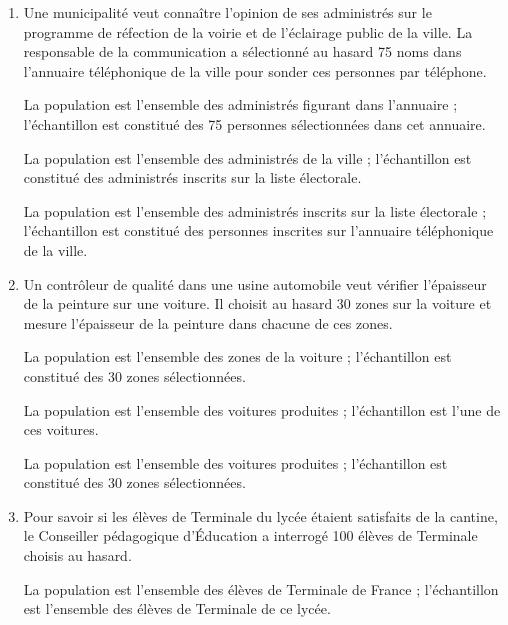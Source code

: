%
%
    \begin{enumerate}
        \item Une municipalité veut connaître l'opinion de ses administrés sur le programme de réfection de la voirie et de l'éclairage public de la ville. La responsable de la communication a sélectionné au hasard 75 noms dans l'annuaire téléphonique de la ville pour sonder ces personnes par téléphone.
              \begin{QCM}
                   La population est l'ensemble des administrés figurant dans l'annuaire ; l'échantillon est constitué des 75 personnes sélectionnées dans cet annuaire.

                  \choice La population est l'ensemble des administrés de la ville ; l'échantillon est constitué des administrés inscrits sur la liste électorale.

                  \choice La population est l'ensemble des administrés inscrits sur la liste électorale ; l'échantillon est constitué des personnes inscrites sur l'annuaire téléphonique de la ville.
              \end{QCM}
        \item Un contrôleur de qualité dans une usine automobile veut vérifier l'épaisseur de la peinture sur une voiture. Il choisit au hasard 30 zones sur la voiture et mesure l'épaisseur de la peinture dans chacune de ces zones.
              \begin{QCM}
                   La population est l'ensemble des zones de la voiture ; l'échantillon est constitué des 30 zones sélectionnées.

                  \choice La population est l'ensemble des voitures produites ; l'échantillon est l'une de ces voitures.

                  \choice La population est l'ensemble des voitures produites ; l'échantillon est constitué des 30 zones sélectionnées.
              \end{QCM}
        \item Pour savoir si les élèves de Terminale du lycée étaient satisfaits de la cantine, le Conseiller pédagogique d'Éducation a interrogé 100 élèves de Terminale choisis au hasard.
              \begin{QCM}
                  \choice La population est l'ensemble des élèves de Terminale de France ; l'échantillon est l'ensemble des élèves de Terminale de ce lycée.


\end{QCM}
\end{enumerate}
